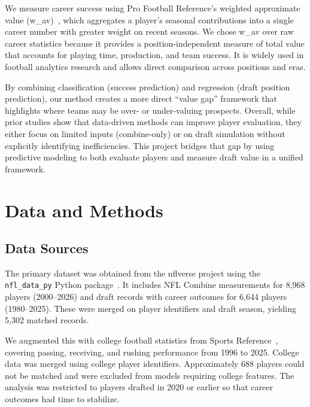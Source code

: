 \documentclass[10pt,twocolumn]{article}
\begin{document}
We measure career success using Pro Football Reference's weighted approximate value (w\_av)~\cite{pfr_av}, which aggregates a player's seasonal contributions into a single career number with greater weight on recent seasons. We chose w\_av over raw career statistics because it provides a position-independent measure of total value that accounts for playing time, production, and team success. It is widely used in football analytics research and allows direct comparison across positions and eras.

By combining classification (success prediction) and regression (draft position prediction), our method creates a more direct ``value gap'' framework that highlights where teams may be over- or under-valuing prospects. Overall, while prior studies show that data-driven methods can improve player evaluation, they either focus on limited inputs (combine-only) or on draft simulation without explicitly identifying inefficiencies. This project bridges that gap by using predictive modeling to both evaluate players and measure draft value in a unified framework.


\section{Data and Methods}

\subsection{Data Sources}

The primary dataset was obtained from the nflverse project using the \texttt{nfl\_data\_py} Python package~\cite{nflverse}. It includes NFL Combine measurements for 8,968 players (2000--2026) and draft records with career outcomes for 6,644 players (1980--2025). These were merged on player identifiers and draft season, yielding 5,302 matched records.

We augmented this with college football statistics from Sports Reference~\cite{sportsref}, covering passing, receiving, and rushing performance from 1996 to 2025. College data was merged using college player identifiers. Approximately 688 players could not be matched and were excluded from models requiring college features. The analysis was restricted to players drafted in 2020 or earlier so that career outcomes had time to stabilize.
\end{document}
